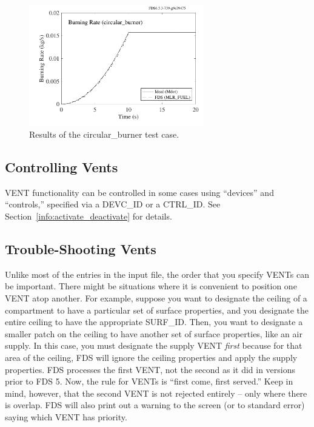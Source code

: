 \documentclass[11pt]{book}
\begin{document}
\begin{figure}[h]
\begin{center}
\includegraphics[width=3in]{SCRIPT_FIGURES/circular_burner}
\caption[Results of the {\ct circular\_burner} test case]{Results of the {\ct circular\_burner} test case.}
\label{circ_burn}
\end{center}
\end{figure}


\subsection{Controlling Vents}

{\ct VENT} functionality can be controlled in some cases using ``devices'' and ``controls,'' specified via a {\ct DEVC\_ID} or a {\ct CTRL\_ID}.
See Section~\ref{info:activate_deactivate} for details.

\subsection{Trouble-Shooting Vents}
\label{info:VENT_Trouble}

Unlike most of the entries in the input file, the order that you specify {\ct VENT}s can be important. There might be
situations where it is convenient to position one {\ct VENT} atop another. For example, suppose you want to designate the
ceiling of a compartment to have a particular set of surface properties, and you designate the entire ceiling to have the
appropriate {\ct SURF\_ID}. Then, you want to designate a smaller patch on the ceiling to have another set of surface
properties, like an air supply. In this case, you must designate the supply {\ct VENT} {\em first} because for that area
of the ceiling, FDS will ignore the ceiling properties and apply the supply properties. FDS processes the first {\ct VENT}, not
the second as it did in versions prior to FDS 5. Now, the rule for {\ct VENT}s is ``first come, first served.''
Keep in mind, however, that the
second {\ct VENT} is not rejected entirely -- only where there is overlap. FDS will also print out a warning to the screen (or to
standard error) saying which {\ct VENT} has priority.
\end{document}
